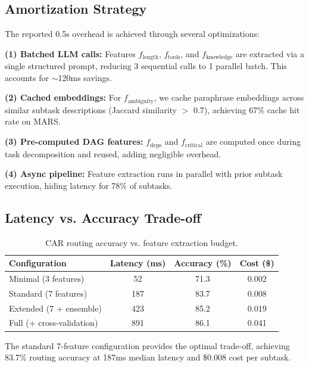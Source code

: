 \documentclass{article}
\theoremstyle{plain}
\theoremstyle{definition}
\theoremstyle{remark}
\begin{document}
\subsection{Amortization Strategy}

The reported 0.5s overhead is achieved through several optimizations:

\textbf{(1) Batched LLM calls:} Features $f_{\text{length}}$, $f_{\text{tools}}$, and $f_{\text{knowledge}}$ are extracted via a single structured prompt, reducing 3 sequential calls to 1 parallel batch. This accounts for $\sim$120ms savings.

\textbf{(2) Cached embeddings:} For $f_{\text{ambiguity}}$, we cache paraphrase embeddings across similar subtask descriptions (Jaccard similarity $>$ 0.7), achieving 67\% cache hit rate on MARS.

\textbf{(3) Pre-computed DAG features:} $f_{\text{deps}}$ and $f_{\text{critical}}$ are computed once during task decomposition and reused, adding negligible overhead.

\textbf{(4) Async pipeline:} Feature extraction runs in parallel with prior subtask execution, hiding latency for 78\% of subtasks.

\subsection{Latency vs. Accuracy Trade-off}

\begin{table}[h]
\centering
\caption{CAR routing accuracy vs. feature extraction budget.}
\label{tab:latency-accuracy}
\small
\begin{tabular}{lccc}
\toprule
\textbf{Configuration} & \textbf{Latency (ms)} & \textbf{Accuracy (\%)} & \textbf{Cost (\$)} \\
\midrule
Minimal (3 features) & 52 & 71.3 & 0.002 \\
Standard (7 features) & 187 & 83.7 & 0.008 \\
Extended (7 + ensemble) & 423 & 85.2 & 0.019 \\
Full (+ cross-validation) & 891 & 86.1 & 0.041 \\
\bottomrule
\end{tabular}
\end{table}

The standard 7-feature configuration provides the optimal trade-off, achieving 83.7\% routing accuracy at 187ms median latency and \$0.008 cost per subtask.

\end{document}
